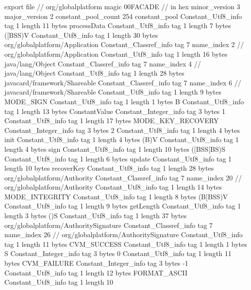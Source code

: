 export file {		// org/globalplatform
	magic	00FACADE		 // in hex
	minor_version	3
	major_version	2
	constant_pool_count	254
	constant_pool {
		Constant_Utf8_info {
			tag	1
			length	11
			bytes	processData
		}
		Constant_Utf8_info {
			tag	1
			length	7
			bytes	([BSS)V
		}
		Constant_Utf8_info {
			tag	1
			length	30
			bytes	org/globalplatform/Application
		}
		Constant_Classref_info {
			tag	7
			name_index	2		// org/globalplatform/Application
		}
		Constant_Utf8_info {
			tag	1
			length	16
			bytes	java/lang/Object
		}
		Constant_Classref_info {
			tag	7
			name_index	4		// java/lang/Object
		}
		Constant_Utf8_info {
			tag	1
			length	28
			bytes	javacard/framework/Shareable
		}
		Constant_Classref_info {
			tag	7
			name_index	6		// javacard/framework/Shareable
		}
		Constant_Utf8_info {
			tag	1
			length	9
			bytes	MODE_SIGN
		}
		Constant_Utf8_info {
			tag	1
			length	1
			bytes	B
		}
		Constant_Utf8_info {
			tag	1
			length	13
			bytes	ConstantValue
		}
		Constant_Integer_info {
			tag	3
			bytes	1
		}
		Constant_Utf8_info {
			tag	1
			length	17
			bytes	MODE_KEY_RECOVERY
		}
		Constant_Integer_info {
			tag	3
			bytes	2
		}
		Constant_Utf8_info {
			tag	1
			length	4
			bytes	init
		}
		Constant_Utf8_info {
			tag	1
			length	4
			bytes	(B)V
		}
		Constant_Utf8_info {
			tag	1
			length	4
			bytes	sign
		}
		Constant_Utf8_info {
			tag	1
			length	10
			bytes	([BSS[BS)S
		}
		Constant_Utf8_info {
			tag	1
			length	6
			bytes	update
		}
		Constant_Utf8_info {
			tag	1
			length	10
			bytes	recoverKey
		}
		Constant_Utf8_info {
			tag	1
			length	28
			bytes	org/globalplatform/Authority
		}
		Constant_Classref_info {
			tag	7
			name_index	20		// org/globalplatform/Authority
		}
		Constant_Utf8_info {
			tag	1
			length	14
			bytes	MODE_INTEGRITY
		}
		Constant_Utf8_info {
			tag	1
			length	8
			bytes	(B[BSS)V
		}
		Constant_Utf8_info {
			tag	1
			length	9
			bytes	getLength
		}
		Constant_Utf8_info {
			tag	1
			length	3
			bytes	()S
		}
		Constant_Utf8_info {
			tag	1
			length	37
			bytes	org/globalplatform/AuthoritySignature
		}
		Constant_Classref_info {
			tag	7
			name_index	26		// org/globalplatform/AuthoritySignature
		}
		Constant_Utf8_info {
			tag	1
			length	11
			bytes	CVM_SUCCESS
		}
		Constant_Utf8_info {
			tag	1
			length	1
			bytes	S
		}
		Constant_Integer_info {
			tag	3
			bytes	0
		}
		Constant_Utf8_info {
			tag	1
			length	11
			bytes	CVM_FAILURE
		}
		Constant_Integer_info {
			tag	3
			bytes	-1
		}
		Constant_Utf8_info {
			tag	1
			length	12
			bytes	FORMAT_ASCII
		}
		Constant_Utf8_info {
			tag	1
			length	10
}}}
